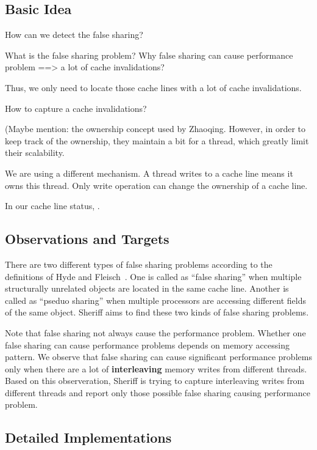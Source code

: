 \label{sec:falseshare}

\subsection{Basic Idea}

How can we detect the false sharing?

What is the false sharing problem? Why false sharing can cause performance problem ==> a lot of cache invalidations? 

Thus, we only need to locate those cache lines with a lot of cache invalidations. 

How to capture a cache invalidations? 

(Maybe mention: the ownership concept used by Zhaoqing. However, in order to keep track of the ownership, they maintain a bit for a thread, which greatly limit their scalability. 

We are using a different mechanism. A thread writes to a cache line means it owns this thread. 
Only write operation can change the ownership of a cache line. 

In our cache line status, . 


\subsection{Observations and Targets}
\label{overview:target}
There are two different types of false sharing problems according to 
the definitions of Hyde and Fleisch~\cite{falseshare:Analysis}. 
One is called as ``false sharing'' when multiple structurally unrelated objects 
are located in the same cache line. 
Another is called as ``pseduo sharing'' when multiple processors 
are accessing different fields of the same object.
Sheriff aims to find these two kinds of false sharing problems. 

Note that false sharing not always cause the performance problem. 
Whether one false sharing can cause performance problems depends on memory accessing pattern. 
We observe that false sharing can cause significant performance problems 
only when there are a lot of \textbf{interleaving} memory writes from different threads. 
Based on this observeration, Sheriff is trying to capture interleaving writes from different threads and 
report only those possible false sharing causing performance problem.

\subsection{Detailed Implementations}

